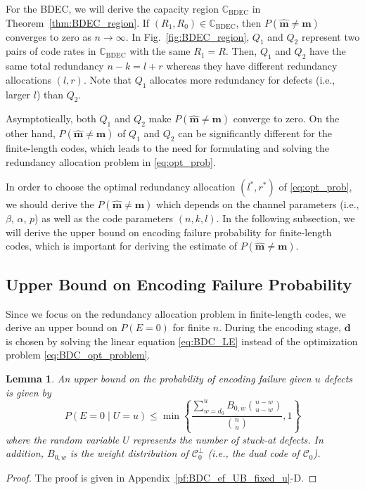 \documentclass[10pt,twocolumn,twoside,submit]{JCNtran}
\newtheorem{lemma}[theorem]{Lemma}
\begin{document}
	
	For the BDEC, we will derive the capacity region $\mathbb{C}_{\text{BDEC}}$ in Theorem~\ref{thm:BDEC_region}. If $(R_1, R_0) \in \mathbb{C}_{\text{BDEC}}$, then $P(\widehat{\mathbf{m}} \ne \mathbf{m})$ converges to zero as $n \rightarrow \infty$. In Fig.~\ref{fig:BDEC_region}, $Q_1$ and $Q_2$ represent two pairs of code rates in ${\mathbb{C}}_{\text{BDEC}}$ with the same $R_1 = R$. Then, $Q_1$ and $Q_2$ have the same total redundancy $n - k = l + r$ whereas they have different redundancy allocations $(l, r)$. Note that $Q_1$ allocates more redundancy for defects (i.e., larger $l$) than $Q_2$. 
	
	Asymptotically, both $Q_1$ and $Q_2$ make $P(\widehat{\mathbf{m}} \ne \mathbf{m})$ converge to zero. On the other hand, $P(\widehat{\mathbf{m}} \ne \mathbf{m})$ of $Q_1$ and $Q_2$ can be significantly different for the finite-length codes, which leads to the need for formulating and solving the redundancy allocation problem in \eqref{eq:opt_prob}. 
	
	In order to choose the optimal redundancy allocation $(l^*, r^*)$ of \eqref{eq:opt_prob}, we should derive the $P(\widehat{\mathbf{m}} \ne \mathbf{m})$ which depends on the channel parameters (i.e., $\beta$, $\alpha$, $p$) as well as the code parameters $(n, k, l)$.  In the following subsection, we will derive the upper bound on encoding failure probability for finite-length codes, which is important for deriving the estimate of $P(\widehat{\mathbf{m}} \ne \mathbf{m})$. 
	
\subsection{Upper Bound on Encoding Failure Probability}
	
	Since we focus on the redundancy allocation problem in finite-length codes, we derive an upper bound on $P(E=0)$ for finite $n$. During the encoding stage, $\mathbf{d}$ is chosen by solving the linear equation \eqref{eq:BDC_LE} instead of the optimization problem \eqref{eq:BDC_opt_problem}. 
	
	\begin{lemma}\label{lemma:BDC_ef_UB_fixed_u} An upper bound on the probability of encoding failure given $u$ defects is given by
	\begin{equation}\label{eq:enc_fail_upper}
	P\left(E=0 \mid U=u \right) \le \min \left\{ \frac{\sum_{w=d_{0}}^{u}{B_{0, w} \binom{n-w}{u-w}}}{\binom{n}{u}}, 1\right\}
	\end{equation}
	where the random variable $U$ represents the number of stuck-at defects. In addition, $B_{0, w}$ is the weight distribution of ${\mathcal{C}}_{0}^{\perp}$ (i.e., the dual code of ${\mathcal{C}}_0$).
	\end{lemma}
	\begin{proof}
		The proof is given in Appendix~\ref{pf:BDC_ef_UB_fixed_u}-D.
	\end{proof}	
	
\end{document}
